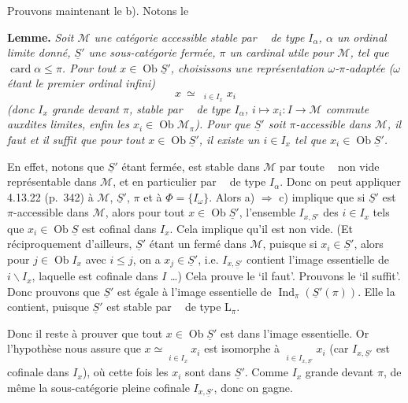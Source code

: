 \documentclass[11pt]{article}
\newcommand{\msp}[1]{\marginpar{\footnotesize [#1]}}
\newcommand{\limind}{\mathop{\underrightarrow{\mathrm{lim}}}}
\begin{document}
Prouvons maintenant le b). Notons le

\textbf{Lemme.} \textit{Soit $\mathcal{M}$ une catégorie accessible stable par $\limind$ de type $I_\alpha$, $\alpha$ un ordinal limite donné, $\underline{S}'$ une sous-catégorie fermée, $\pi$ un cardinal utile}
\msp{page 17}
\textit{pour $\mathcal{M}$, tel que} $\operatorname{card}\alpha\leqslant\pi$\textit{. Pour tout $x\in\operatorname{Ob}\underline{S}'$, choisissons une représentation $\omega$-$\pi$-adaptée ($\omega$ étant le premier ordinal infini)}
\[
x\ \simeq\ \limind_{i\in I_x}x_i
\]
\textit{(donc $I_x$ grande devant $\pi$, stable par $\limind$ de type $I_\alpha$, $i\longmapsto x_i:I\longrightarrow\mathcal{M}$ commute auxdites limites, enfin les $x_i\in\operatorname{Ob}\mathcal{M}_\pi$). Pour que $\underline{S}'$ soit $\pi$-accessible dans $\mathcal{M}$, il faut et il suffit que pour tout $x\in\operatorname{Ob}\underline{S}'$, il existe un $i\in I_x$ tel que $x_i\in\operatorname{Ob}\underline{S}'$.}

En effet, notons que $\underline{S}'$ étant fermée, est stable dans $\mathcal{M}$ par toute $\limind$ non vide représentable dans $\mathcal{M}$, et en particulier par $\limind$ de type $I_\alpha$. Donc on peut appliquer 4.13.22 (p.~342) à $\mathcal{M}$, $\underline{S}'$, $\pi$ et à $\Phi=\{I_\omega\}$. Alors a) $\Longrightarrow$ c) implique que si $\underline{S}'$ est $\pi$-accessible dans $\mathcal{M}$, alors pour tout $x\in\operatorname{Ob}\underline{S}'$, l'ensemble $I_{x,S'}$ des $i\in I_x$ tels que $x_i\in\operatorname{Ob}\underline{S}$ est cofinal dans $I_x$. Cela implique qu'il est non vide. (Et réciproquement d'ailleurs, $\underline{S}'$ étant un fermé dans $\mathcal{M}$, puisque si $x_i\in\underline{S}'$, alors pour $j\in\operatorname{Ob}I_x$ avec $i\leqslant j$, on a $x_j\in\underline{S}'$, i.e. $I_{x,\underline{S}'}$ contient l'image essentielle de $i\backslash I_x$, laquelle est cofinale dans $I$ \dots) Cela prouve le `il faut'. Prouvons le `il suffit'. Donc prouvons que $\underline{S}'$ est égale à l'image essentielle de $\operatorname{Ind}_\pi(\underline{S}'(\pi))$. Elle la contient, puisque $\underline{S}'$ est stable par $\limind$ de type $\mathrm{L}_\pi$. %

\msp{page 18}
Donc il reste à prouver que tout $x\in\operatorname{Ob}\underline{S}'$ est dans l'image essentielle. Or l'hypothèse nous assure que $x\simeq\limind\limits_{i\in I_x}x_i$ est isomorphe à $\limind\limits_{i\in I_{x,\underline{S}'}}x_i$ (car $I_{x,\underline{S}'}$ est cofinale dans $I_x$), où cette fois les $x_i$ sont dans $\underline{S}'$. Comme $I_x$ grande devant $\pi$, de même la sous-catégorie pleine cofinale $I_{x,\underline{S}'}$, donc on gagne.
\end{document}
